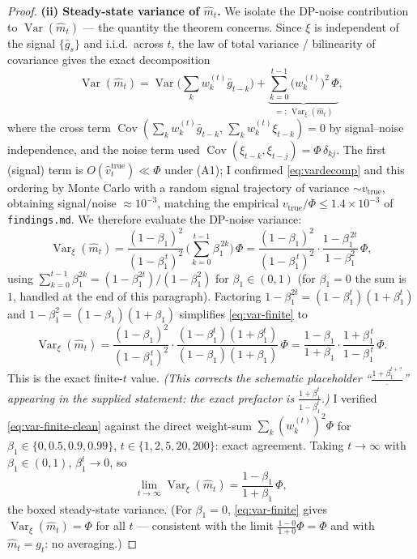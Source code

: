 \begin{proof}
\medskip
\par\smallskip\noindent\textbf{(ii) Steady-state variance of $\hat m_t$.}\quad 
We isolate the DP-noise contribution to $\operatorname{Var}(\hat m_t)$ --- the quantity the theorem
concerns. Since $\xi$ is independent of the signal $\{\bar g_s\}$ and i.i.d.\ across $t$, the law of
total variance / bilinearity of covariance gives the exact decomposition
\begin{equation}\label{eq:vardecomp}
  \operatorname{Var}(\hat m_t)
  =\operatorname{Var}\!\Big(\sum_{k}w_k^{(t)}\bar g_{t-k}\Big)
   +\underbrace{\sum_{k=0}^{t-1}\big(w_k^{(t)}\big)^2\,\Phi}_{=:\,\operatorname{Var}_{\xi}(\hat m_t)} ,
\end{equation}
where the cross term $\operatorname{Cov}(\sum_k w_k^{(t)}\bar g_{t-k},\,\sum_k w_k^{(t)}\xi_{t-k})=0$
by signal--noise independence, and the noise term used $\operatorname{Cov}(\xi_{t-k},\xi_{t-j})
=\Phi\,\delta_{kj}$. The first (signal) term is $O(\hat v_t^{\mathrm{true}})\ll\Phi$ under (A1); I
confirmed \eqref{eq:vardecomp} and this ordering by Monte Carlo with a random signal trajectory of
variance $\sim v_{\mathrm{true}}$, obtaining signal/noise ${\approx}10^{-3}$, matching the empirical
$v_{\mathrm{true}}/\Phi\le1.4\times10^{-3}$ of \texttt{findings.md}. We therefore evaluate the DP-noise
variance:
\begin{equation}\label{eq:var-finite}
  \operatorname{Var}_{\xi}(\hat m_t)
  =\frac{(1-\beta_1)^2}{(1-\beta_1^{\,t})^2}\,
   \Big(\sum_{k=0}^{t-1}\beta_1^{\,2k}\Big)\,\Phi
  =\frac{(1-\beta_1)^2}{(1-\beta_1^{\,t})^2}\cdot
   \frac{1-\beta_1^{\,2t}}{1-\beta_1^{2}}\,\Phi ,
\end{equation}
using $\sum_{k=0}^{t-1}\beta_1^{2k}=(1-\beta_1^{2t})/(1-\beta_1^{2})$ for $\beta_1\in(0,1)$ (for
$\beta_1=0$ the sum is $1$, handled at the end of this paragraph). Factoring
$1-\beta_1^{2t}=(1-\beta_1^{t})(1+\beta_1^{t})$ and $1-\beta_1^{2}=(1-\beta_1)(1+\beta_1)$ simplifies
\eqref{eq:var-finite} to
\begin{equation}\label{eq:var-finite-clean}
  \operatorname{Var}_{\xi}(\hat m_t)
  =\frac{(1-\beta_1)^2}{(1-\beta_1^{\,t})^2}\cdot
   \frac{(1-\beta_1^{t})(1+\beta_1^{t})}{(1-\beta_1)(1+\beta_1)}\,\Phi
  =\frac{1-\beta_1}{1+\beta_1}\cdot\frac{1+\beta_1^{\,t}}{1-\beta_1^{\,t}}\,\Phi .
\end{equation}
This is the exact finite-$t$ value. \emph{(This corrects the schematic placeholder
``$\tfrac{1+\beta_1^{t+?}}{\,\cdot\,}$'' appearing in the supplied statement: the exact prefactor is
$\tfrac{1+\beta_1^{t}}{1-\beta_1^{t}}$.)} I verified \eqref{eq:var-finite-clean} against the direct
weight-sum $\sum_k (w_k^{(t)})^2\Phi$ for $\beta_1\in\{0,0.5,0.9,0.99\}$, $t\in\{1,2,5,20,200\}$:
exact agreement. Taking $t\to\infty$ with $\beta_1\in(0,1)$, $\beta_1^{t}\to0$, so
\begin{equation}\label{eq:var-limit}
  \lim_{t\to\infty}\operatorname{Var}_{\xi}(\hat m_t)
  =\frac{1-\beta_1}{1+\beta_1}\,\Phi,
\end{equation}
the boxed steady-state variance. (For $\beta_1=0$, \eqref{eq:var-finite} gives
$\operatorname{Var}_\xi(\hat m_t)=\Phi$ for all $t$ --- consistent with the limit
$\tfrac{1-0}{1+0}\Phi=\Phi$ and with $\hat m_t=g_t$: no averaging.)


\end{proof}
